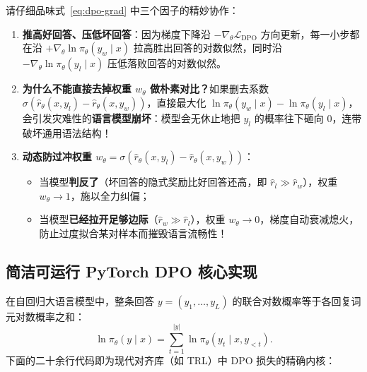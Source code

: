 请仔细品味式~\eqref{eq:dpo-grad} 中三个因子的精妙协作：
\begin{enumerate}
  \item \textbf{推高好回答、压低坏回答}：因为梯度下降沿 $-\nabla_\theta \mathcal{L}_{\mathrm{DPO}}$ 方向更新，每一小步都在沿 $+\nabla_\theta \ln \pi_\theta(y_w \mid x)$ 拉高胜出回答的对数似然，同时沿 $-\nabla_\theta \ln \pi_\theta(y_l \mid x)$ 压低落败回答的对数似然。
  \item \textbf{为什么不能直接去掉权重 $w_\theta$ 做朴素对比？}如果删去系数 $\sigma(\hat{r}_\theta(x, y_l) - \hat{r}_\theta(x, y_w))$，直接最大化 $\ln \pi_\theta(y_w\mid x) - \ln \pi_\theta(y_l\mid x)$，会引发灾难性的\textbf{语言模型崩坏}：模型会无休止地把 $y_l$ 的概率往下砸向 $0$，连带破坏通用语法结构！
  \item \textbf{动态防过冲权重 $w_\theta = \sigma(\hat{r}_\theta(x, y_l) - \hat{r}_\theta(x, y_w))$}：
  \begin{itemize}
    \item 当模型\textbf{判反了}（坏回答的隐式奖励比好回答还高，即 $\hat{r}_l \gg \hat{r}_w$），权重 $w_\theta \to 1$，施以全力纠偏；
    \item 当模型\textbf{已经拉开足够边际}（$\hat{r}_w \gg \hat{r}_l$），权重 $w_\theta \to 0$，梯度自动衰减熄火，防止过度拟合某对样本而摧毁语言流畅性！
  \end{itemize}
\end{enumerate}

\subsection{简洁可运行 PyTorch DPO 核心实现}

在自回归大语言模型中，整条回答 $y = (y_1, \dots, y_L)$ 的联合对数概率等于各回复词元对数概率之和：
\[
  \ln \pi_\theta(y \mid x) = \sum_{t=1}^{|y|} \ln \pi_\theta(y_t \mid x, y_{<t}).
\]
下面的二十余行代码即为现代对齐库（如 TRL）中 DPO 损失的精确内核：


